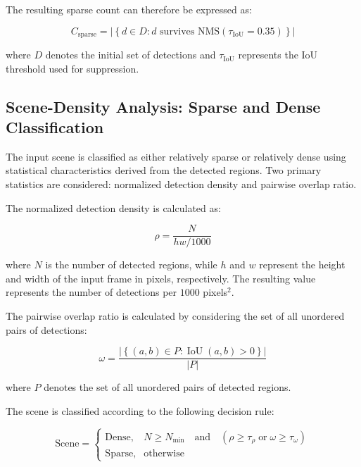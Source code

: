 \documentclass[12pt,a4paper]{report}
\begin{document}
The resulting sparse count can therefore be expressed as:

\begin{equation}
C_{\mathrm{sparse}}
=
\left|
\left\{
d\in D:
d\text{ survives NMS}
\left(\tau_{\mathrm{IoU}}=0.35\right)
\right\}
\right|
\label{eq:sparse-count}
\end{equation}

where $D$ denotes the initial set of detections and
$\tau_{\mathrm{IoU}}$ represents the IoU threshold used for suppression.


\subsection{Scene-Density Analysis: Sparse and Dense Classification}
\label{sec:density-analysis}

The input scene is classified as either relatively sparse or relatively
dense using statistical characteristics derived from the detected regions.
Two primary statistics are considered: normalized detection density and
pairwise overlap ratio.

The normalized detection density is calculated as:

\begin{equation}
\rho =
\frac{N}
{hw/1000}
\label{eq:detection-density}
\end{equation}

where $N$ is the number of detected regions, while $h$ and $w$ represent the
height and width of the input frame in pixels, respectively. The resulting
value represents the number of detections per $1000$ pixels$^2$.

The pairwise overlap ratio is calculated by considering the set of all
unordered pairs of detections:

\begin{equation}
\omega =
\frac{
\left|
\left\{
(a,b)\in P:
\operatorname{IoU}(a,b)>0
\right\}
\right|
}
{|P|}
\label{eq:overlap-ratio}
\end{equation}

where $P$ denotes the set of all unordered pairs of detected regions.

The scene is classified according to the following decision rule:

\begin{equation}
\text{Scene} =
\begin{cases}
\text{Dense}, &
N\geq N_{\min}
\quad\text{and}\quad
(\rho\geq\tau_{\rho}
\;\text{or}\;
\omega\geq\tau_{\omega})
\\[6pt]
\text{Sparse}, & \text{otherwise}
\end{cases}
\label{eq:scene-classification}
\end{equation}
\end{document}
